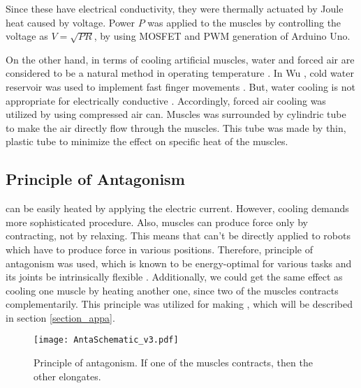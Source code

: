 Since these \scps have electrical conductivity, they were thermally actuated by Joule heat caused by voltage.
Power $ P $ was applied to the muscles by controlling the voltage as $ V=\sqrt{PR} $, by using MOSFET and PWM generation of Arduino Uno.

On the other hand, in terms of cooling artificial muscles, water and forced air are considered to be a natural method in operating temperature \cite{madden}.
In Wu \etal, cold water reservoir was used to implement fast finger movements \cite{finger}.
But, water cooling is not appropriate for electrically conductive \scpsnospace. Accordingly, forced air cooling was utilized by using compressed air can.
Muscles was surrounded by cylindric tube to make the air directly flow through the muscles.
This tube was made by thin, plastic tube to minimize the effect on specific heat of the muscles.


\subsection{Principle of Antagonism} \label{subsection_anta}
\scps can be easily heated by applying the electric current. However, cooling demands more sophisticated procedure. Also, muscles can produce force only by contracting, not by relaxing. This means that \scps can't be directly applied to robots which have to produce force in various positions.
Therefore, principle of antagonism was used, which is known to be energy-optimal for various tasks and its joints be intrinsically flexible \cite{antagonism}. 
Additionally, we could get the same effect as cooling one muscle by heating another one, since two of the muscles contracts complementarily.
This principle was utilized for making \antanospace, which will be described in section \ref{section_appa}.

\begin{figure}[b]
	\centering
	\texttt{[image: AntaSchematic\_v3.pdf]}
	\caption[Principle of Antagonism.]{Principle of antagonism. If one of the muscles contracts, then the other elongates.}
	\label{antagonism}
\end{figure}


